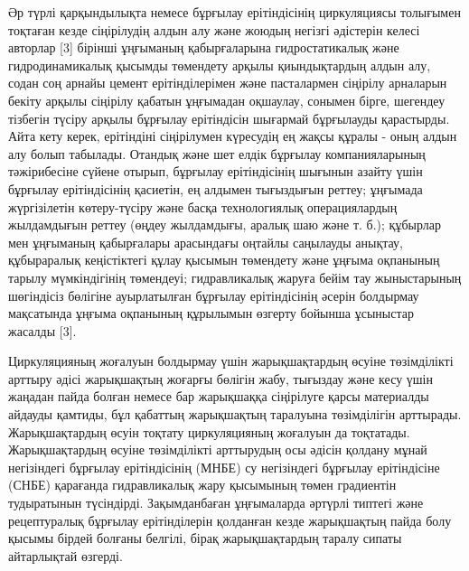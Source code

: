 \begin{multicols}{2}
Әр түрлі қарқындылықта немесе бұрғылау ерітіндісінің циркуляциясы
толығымен тоқтаған кезде сіңірілудің алдын алу және жоюдың негізгі
әдістерін келесі авторлар {[}3{]} бірінші ұңғыманың қабырғаларына
гидростатикалық және гидродинамикалық қысымды төмендету арқылы
қиындықтардың алдын алу, содан соң арнайы цемент ерітінділерімен және
пасталармен сіңірілу арналарын бекіту арқылы сіңірілу қабатын ұңғымадан
оқшаулау, сонымен бірге, шегендеу тізбегін түсіру арқылы бұрғылау
ерітіндісін шығармай бұрғылауды қарастырды. Айта кету керек, ерітіндіні
сіңірілумен күресудің ең жақсы құралы - оның алдын алу болып табылады.
Отандық және шет елдік бұрғылау компанияларының тәжірибесіне сүйене
отырып, бұрғылау ерітіндісінің шығынын азайту үшін бұрғылау
ерітіндісінің қасиетін, ең алдымен тығыздығын реттеу; ұңғымада
жүргізілетін көтеру-түсіру және басқа технологиялық операциялардың
жылдамдығын реттеу (өңдеу жылдамдығы, аралық шаю және т. б.); құбырлар
мен ұңғыманың қабырғалары арасындағы оңтайлы саңылауды анықтау,
құбыраралық кеңістіктегі құлау қысымын төмендету және ұңғыма оқпанының
тарылу мүмкіндігінің төмендеуі; гидравликалық жаруға бейім тау
жыныстарының шөгіндісіз бөлігіне ауырлатылған бұрғылау ерітіндісінің
әсерін болдырмау мақсатында ұңғыма оқпанының құрылымын өзгерту бойынша
ұсыныстар жасалды {[}3{]}.

Циркуляцияның жоғалуын болдырмау үшін жарықшақтардың өсуіне төзімділікті
арттыру әдісі жарықшақтың жоғарғы бөлігін жабу, тығыздау және кесу үшін
жаңадан пайда болған немесе бар жарықшаққа сіңірілуге қарсы материалды
айдауды қамтиды, бұл қабаттың жарықшақтың таралуына төзімділігін
арттырады. Жарықшақтардың өсуін тоқтату циркуляцияның жоғалуын да
тоқтатады. Жарықшақтардың өсуіне төзімділікті арттырудың осы әдісін
қолдану мұнай негізіндегі бұрғылау ерітіндісінің (МНБЕ) су негізіндегі
бұрғылау ерітіндісіне (СНБЕ) қарағанда гидравликалық жару қысымының
төмен градиентін тудыратынын түсіндірді. Зақымданбаған ұңғымаларда
әртүрлі типтегі және рецептуралық бұрғылау ерітінділерін қолданған кезде
жарықшақтың пайда болу қысымы бірдей болғаны белгілі, бірақ
жарықшақтардың таралу сипаты айтарлықтай өзгерді.


\end{multicols}
